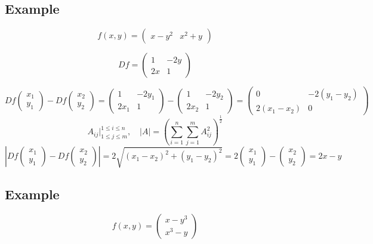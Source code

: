 \documentclass[11pt]{article}
\begin{document}
\subsection*{Example}
\[
f(x,y) = \begin{pmatrix}
    x - y^2 & x^2 + y
\end{pmatrix}
\]

\[
Df = \begin{pmatrix}
    1 & -2y \\
    2x & 1
\end{pmatrix}
\]

\[
Df \begin{pmatrix}
    x_1 \\
    y_1
\end{pmatrix} - Df \begin{pmatrix}
    x_2 \\
    y_2
\end{pmatrix} = \begin{pmatrix}
    1 & -2y_1 \\
    2x_1 & 1
\end{pmatrix} - \begin{pmatrix}
    1 & -2y_2 \\
    2x_2 & 1
\end{pmatrix} = \begin{pmatrix}
    0 & -2(y_1 - y_2) \\
    2(x_1 - x_2) & 0
\end{pmatrix}
\]
\[
A_{ij}\big|_{1 \leq j \leq m}^{1 \leq i \leq n}, \quad |A| = \left(\sum_{i=1}^{n} \sum_{j=1}^{m} A_{ij}^2 \right)^{\frac{1}{2}}
\]
\[
\left|Df \begin{pmatrix}
    x_1 \\
    y_1
\end{pmatrix} - Df \begin{pmatrix}
    x_2 \\
    y_2
\end{pmatrix}\right| = 2 \sqrt{(x_1 - x_2)^2 + (y_1 - y_2)^2} = 2 \begin{pmatrix}
    x_1 \\
    y_1
\end{pmatrix} - \begin{pmatrix}
    x_2 \\
    y_2
\end{pmatrix}  = 2  x - y 
\]

\subsection*{Example}
\[
f(x,y) = \begin{pmatrix}
    x - y^3 \\
    x^3 - y
\end{pmatrix}
\]
\end{document}
